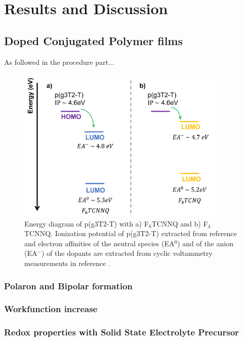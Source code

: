 \chapter{Results and Discussion}
\label{cha:3}

\section{Doped Conjugated Polymer films}

As followed in the procedure part...


\begin{figure}
  \centering
  \includegraphics[width=10cm]{Images/dopingprocess.png}
  \caption{Energy diagram of p(g3T2-T) with a) F$_{6}$TCNNQ and b) F$_{4}$TCNNQ. Ionization potential of p(g3T2-T) extracted from reference \cite{tanTuningOrganicElectrochemical2022} and electron affinities of the neutral species (EA$^{0}$) and of the anion (EA$^{-}$) of the dopants are extracted from cyclic voltammetry measurements in reference \cite{kieferDoubleDopingConjugated2019}.}
  \label{fig:doping}
\end{figure}


\subsection{Polaron and Bipolar formation}

\subsection{Workfunction increase}

\subsection{Redox properties with Solid State Electrolyte Precursor}


